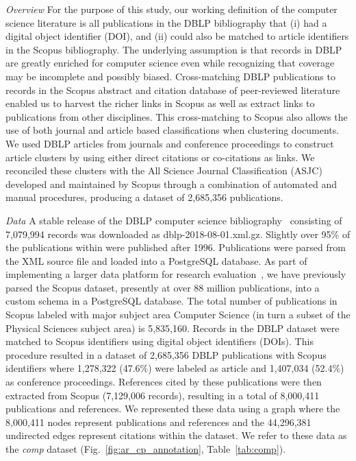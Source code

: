  \emph{Overview} For the purpose of this study, our working definition of the computer science literature is all publications in the DBLP bibliography that (i) had a digital object identifier (DOI), and (ii) could also be matched to article identifiers in the Scopus bibliography. The underlying assumption is that records in DBLP are greatly enriched for computer science even while recognizing that coverage may be incomplete and possibly biased. Cross-matching DBLP publications to records in the Scopus abstract and citation database of peer-reviewed literature enabled us to harvest the richer links in Scopus as well as extract links to publications from other disciplines. This cross-matching to Scopus also allows the use of both journal and article based classifications when clustering documents. We used DBLP articles from journals and conference proceedings to construct article clusters by using either direct citations or co-citations as links. We reconciled these clusters with the All Science Journal Classification (ASJC) developed and maintained by Scopus through a combination of automated and manual procedures, producing a dataset of  2,685,356 publications.

\emph{Data} A stable release of the DBLP computer science bibliography~\cite{dblp_ref} consisting of 7,079,994 records was downloaded as dblp-2018-08-01.xml.gz. 
Slightly over 95\% of the publications within were published after 1996. 
Publications were parsed from the XML source file and loaded into a PostgreSQL database. As part of implementing a larger data platform for research evaluation~\cite{GithubERNIE2019}, we have previously parsed the Scopus dataset, presently at over 88 million publications, into a custom schema in a PostgreSQL database. 
The total number of publications in Scopus labeled with major subject area Computer Science (in turn a subset of the Physical Sciences subject area) is 5,835,160. Records in the DBLP dataset were matched to Scopus identifiers using digital object identifiers (DOIs). This procedure resulted in a dataset of 2,685,356 DBLP publications with Scopus identifiers where 1,278,322 (47.6\%) were labeled as article and 1,407,034 (52.4\%) as conference proceedings.  References cited by these publications were then extracted from Scopus (7,129,006 records), resulting in a total of 8,000,411 
publications and references. 
We represented these data using a graph where the 8,000,411 nodes represent
publications and references  and the 44,296,381 undirected edges represent citations within the dataset. 
We refer to these data as the  \emph{comp} dataset (Fig.~\ref{fig:ar_cp_annotation}, Table~\ref{tab:comp}).  
 
